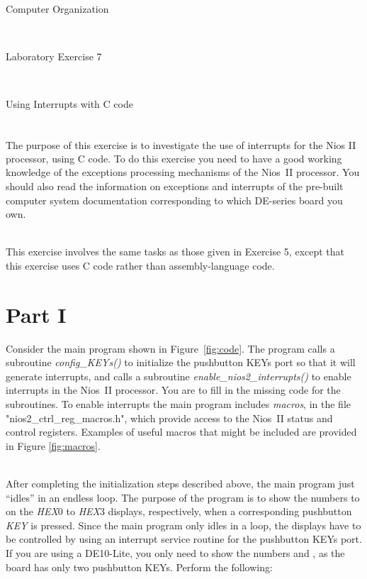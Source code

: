 \documentclass[epsfig,10pt,fullpage]{article}
\newcommand{\LabNum}{7}
\begin{document}
\centerline{\huge Computer Organization}
~\\
\centerline{\huge Laboratory Exercise \LabNum}
~\\
\centerline{\large Using Interrupts with C code}
~\\


The purpose of this exercise is to investigate the use of interrupts for the Nios\textsuperscript{\textregistered} II
processor, using C code. To do this exercise you need to have a good working knowledge of
the exceptions processing mechanisms of the Nios~II processor.
You should also read the information on exceptions and interrupts of the 
pre-built computer system documentation corresponding to which DE-series board you own.

~\\
This exercise involves the same tasks as those given in Exercise 5,
except that this exercise uses C code rather than assembly-language code.

\section*{Part I}
Consider the main program shown in Figure~\ref{fig:code}. The program calls a 
subroutine {\it config\_KEYs()} to initialize the pushbutton KEYs port so that it will generate
interrupts, and calls a subroutine {\it enable\_nios2\_interrupts()} to enable
interrupts in the Nios~II processor. You are to fill in the missing code for the 
subroutines. To enable interrupts the main program includes
{\it macros}, in the file "nios2\_ctrl\_reg\_macros.h", which provide access to the Nios~II
status and control registers.  Examples of useful macros that might be included 
are provided in Figure \ref{fig:macros}. 

~\\
After completing the initialization steps
described above, the main program just ``idles'' in an endless loop.
The purpose of the program is to show the numbers  to  on the {\it HEX}0
to {\it HEX}3 displays, respectively, when a corresponding pushbutton {\it KEY} is pressed. 
Since the main program only idles in a loop, the displays have to be controlled by using an 
interrupt service routine for the pushbutton KEYs port. If you are using a DE10-Lite,
you only need to show the numbers  and , as the board has only two pushbutton KEYs.
Perform the following:
\end{document}
